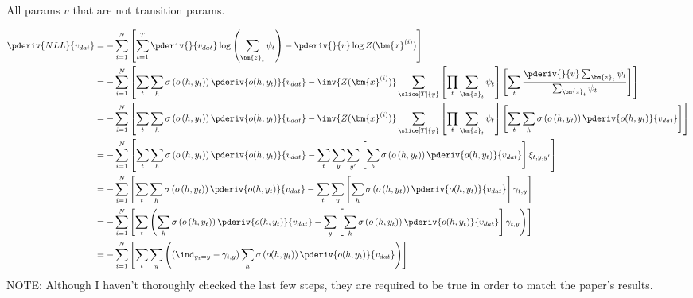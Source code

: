 \documentclass[11pt]{article}
\renewcommand\vec[2][]{\bm{#2}_{#1}}
\begin{document}
\begin{example} 

All params $v$ that are not transition params. 

\begin{align}
	\pderiv{NLL}{v_{dat}} 
		&=  - \sum_{i=1}^{N} \left[ \sum_{t = 1}^{T} \pderiv{}{v_{dat}} \log\left( \sum_{\vec[t]{z}} \psi_t \right) 
		- \pderiv{}{v} \log Z(\vec{x}^{(i)}) \right] \\
		&= - \sum_{i=1}^{N} \left[ \sum_t \sum_h \sigma\left(o\left(h, y_t\right)\right) \pderiv{o(h, y_t)}{v_{dat}}
		 - \inv{Z(\vec{x}^{(i)})} \sum_{\slice[T]{y}}   
		 \left[ \prod_t \sum_{\vec[t]{z}} \psi_t \right] \left[
		 \sum_t \frac{\pderiv{}{v} \sum_{\vec[t]{z}}  \psi_t }{ \sum_{\vec[t]{z}} \psi_t   }
		 \right]
		  \right] \\ 
		&= - \sum_{i=1}^{N} \left[ \sum_t \sum_h \sigma\left(o\left(h, y_t\right)\right) \pderiv{o(h, y_t)}{v_{dat}}
				- \inv{Z(\vec{x}^{(i)})} \sum_{\slice[T]{y}}   
				\left[ \prod_t \sum_{\vec[t]{z}} \psi_t \right] \left[
				\sum_t \sum_h \sigma\left(o\left(h, y_t\right)\right) \pderiv{o(h, y_t)}{v_{dat}}
				\right]
				\right] \\
		&= - \sum_{i=1}^{N} \left[ \sum_t \sum_h \sigma\left(o\left(h, y_t\right)\right) \pderiv{o(h, y_t)}{v_{dat}}
				- \sum_t \sum_y \sum_{y'} \left[\sum_h \sigma\left(o\left(h, y_t\right)\right) \pderiv{o(h, y_t)}{v_{dat}} \right] \xi_{t,y,y'}
				\right] \\
		&= - \sum_{i=1}^{N} \left[ \sum_t \sum_h \sigma\left(o\left(h, y_t\right)\right) \pderiv{o(h, y_t)}{v_{dat}}
				- \sum_t \sum_y \left[\sum_h \sigma\left(o\left(h, y_t\right)\right) \pderiv{o(h, y_t)}{v_{dat}} \right] \gamma_{t,y}
				\right] \\
		&= - \sum_{i=1}^{N} \left[ \sum_t \left( \sum_h \sigma\left(o\left(h, y_t\right)\right) \pderiv{o(h, y_t)}{v_{dat}}
		 - \sum_y \left[\sum_h \sigma\left(o\left(h, y_t\right)\right) \pderiv{o(h, y_t)}{v_{dat}} \right] \gamma_{t,y}
		\right) \right] \\
		&= - \sum_{i=1}^{N} \left[ \sum_t \sum_y \left(    \left(
			\ind_{y_t = y} -  \gamma_{t,y} \right) 
		\sum_h   \sigma\left(o(h, y_t)\right) \pderiv{o(h, y_t)}{v_{dat}} \right) \right] 
\end{align}
NOTE: Although I haven't thoroughly checked the last few steps, they are required to be true in order to match the paper's results.
\end{example}
 
\end{document}
